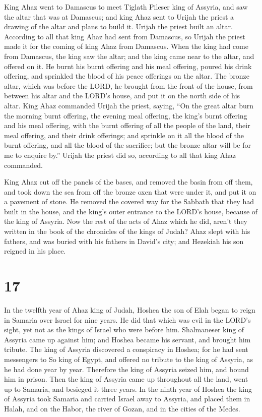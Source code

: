  King Ahaz went to Damascus to meet Tiglath Pileser king of
Assyria, and saw the altar that was at Damascus; and king Ahaz sent to
Urijah the priest a drawing of the altar and plans to build it.
 Urijah the priest built an altar. According to all that
king Ahaz had sent from Damascus, so Urijah the priest made it for the
coming of king Ahaz from Damascus.  When the king had come
from Damascus, the king saw the altar; and the king came near to the
altar, and offered on it.  He burnt his burnt offering and
his meal offering, poured his drink offering, and sprinkled the blood of
his peace offerings on the altar.  The bronze altar, which
was before the LORD, he brought from the front of the house, from
between his altar and the LORD's house, and put it on the north side of
his altar.  King Ahaz commanded Urijah the priest, saying,
``On the great altar burn the morning burnt offering, the evening meal
offering, the king's burnt offering and his meal offering, with the
burnt offering of all the people of the land, their meal offering, and
their drink offerings; and sprinkle on it all the blood of the burnt
offering, and all the blood of the sacrifice; but the bronze altar will
be for me to enquire by.''  Urijah the priest did so,
according to all that king Ahaz commanded.

 King Ahaz cut off the panels of the bases, and removed the
basin from off them, and took down the sea from off the bronze oxen that
were under it, and put it on a pavement of stone.  He
removed the covered way for the Sabbath that they had built in the
house, and the king's outer entrance to the LORD's house, because of the
king of Assyria.  Now the rest of the acts of Ahaz which he
did, aren't they written in the book of the chronicles of the kings of
Judah?  Ahaz slept with his fathers, and was buried with
his fathers in David's city; and Hezekiah his son reigned in his place.

\hypertarget{section-16}{%
\section{17}\label{section-16}}

 In the twelfth year of Ahaz king of Judah, Hoshea the son
of Elah began to reign in Samaria over Israel for nine years.
 He did that which was evil in the LORD's sight, yet not as
the kings of Israel who were before him.  Shalmaneser king
of Assyria came up against him; and Hoshea became his servant, and
brought him tribute.  The king of Assyria discovered a
conspiracy in Hoshea; for he had sent messengers to So king of Egypt,
and offered no tribute to the king of Assyria, as he had done year by
year. Therefore the king of Assyria seized him, and bound him in prison.
 Then the king of Assyria came up throughout all the land,
went up to Samaria, and besieged it three years.  In the
ninth year of Hoshea the king of Assyria took Samaria and carried Israel
away to Assyria, and placed them in Halah, and on the Habor, the river
of Gozan, and in the cities of the Medes.

